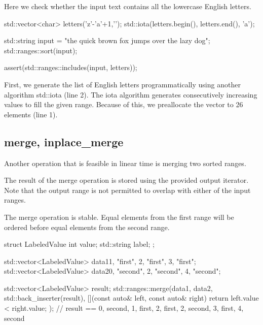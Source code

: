 Here we check whether the input text contains all the lowercase English letters.

\begin{box-note}
\begin{cppcode}
std::vector<char> letters('z'-'a'+1,'\0');
std::iota(letters.begin(), letters.end(), 'a');

std::string input = "the quick brown fox jumps over the lazy dog";
std::ranges::sort(input);

assert(std::ranges::includes(input, letters));
\end{cppcode}
\end{box-note}

First, we generate the list of English letters programmatically using another algorithm std::iota (line 2). The iota algorithm generates consecutively increasing values to fill the given range. Because of this, we preallocate the vector to 26 elements (line 1).

\subsection{merge, inplace\_merge}

Another operation that is feasible in linear time is merging two sorted ranges.



The result of the merge operation is stored using the provided output iterator. Note that the output range is not permitted to overlap with either of the input ranges.

The merge operation is stable. Equal elements from the first range will be ordered before equal elements from the second range.

\begin{box-note}
\begin{cppcode}
struct LabeledValue {
    int value;
    std::string label;
};

std::vector<LabeledValue> data1{{1, "first"}, {2, "first"}, {3, "first"}};
std::vector<LabeledValue> data2{{0, "second"}, {2, "second"}, {4, "second"}};

std::vector<LabeledValue> result;
std::ranges::merge(data1, data2, std::back_inserter(result),
  [](const auto& left, const auto& right) { return left.value < right.value; });
// result == {0, second}, {1, first}, {2, first}, {2, second}, {3, first}, {4, second}
\end{cppcode}
\end{box-note}

